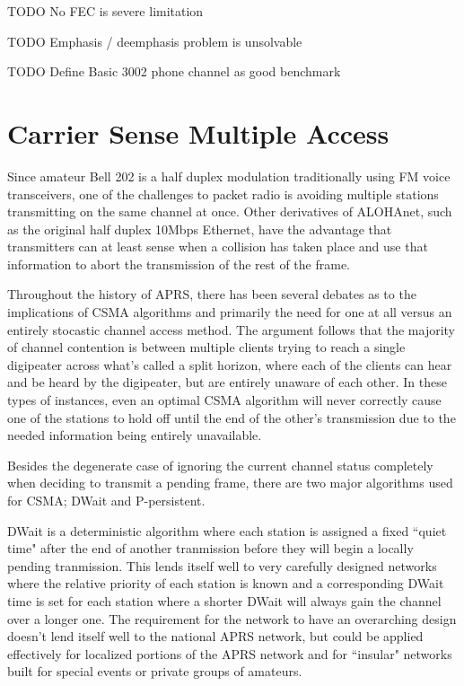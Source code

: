 TODO No FEC is severe limitation

TODO Emphasis / deemphasis problem is unsolvable

TODO Define Basic 3002 phone channel as good benchmark

\section{Carrier Sense Multiple Access}

Since amateur Bell 202 is a half duplex modulation traditionally using FM voice 
transceivers, one of the challenges to packet radio is avoiding multiple stations
transmitting on the same channel at once. Other derivatives of ALOHAnet, such as 
the original half duplex 10Mbps Ethernet, have the advantage that transmitters can
at least sense when a collision has taken place and use that information to abort
the transmission of the rest of the frame.

Throughout the history of APRS, there has been several debates as to the implications
of CSMA algorithms and primarily the need for one at all versus an entirely 
stocastic channel access method. The argument follows that the majority of 
channel contention is between multiple clients trying to reach a single digipeater
across what's called a split horizon, where each of the clients can hear and be heard
by the digipeater, but are entirely unaware of each other. In these types of instances,
even an optimal CSMA algorithm will never correctly cause one of the stations to hold 
off until the end of the other's transmission due to the needed information being
entirely unavailable.

Besides the degenerate case of ignoring the current channel status completely when 
deciding to transmit a pending frame, there are two major algorithms used for CSMA;
DWait and P-persistent.

DWait is a deterministic algorithm where each station is assigned a fixed
``quiet time" after the end of another tranmission before they will begin a locally
pending tranmission. This lends itself well to very carefully designed networks
where the relative priority of each station is known and a corresponding DWait time
is set for each station where a shorter DWait will always gain the channel over a longer
one. The requirement for the network to have an overarching design doesn't lend itself
well to the national APRS network, but could be applied effectively for localized 
portions of the APRS network and for ``insular" networks built for special events or
private groups of amateurs.

